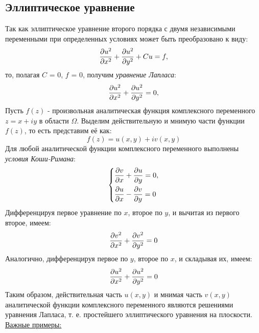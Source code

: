\documentclass[../main.tex]{subfiles}
\begin{document}
\subsection{Эллиптическое уравнение}
Так как эллиптическое уравнение второго порядка с двумя независимыми переменными при определенных условиях может быть преобразовано к виду:
\[
	\pderivtwo{u}{x}{x} + \pderivtwo{u}{y}{y} + Cu = f,
\]
то, полагая $C$ = 0, $f$ = 0, получим \textit{уравнение Лапласа}:
\begin{equation}
	\pderivtwo{u}{x}{x} + \pderivtwo{u}{y}{y} = 0,
\end{equation}
Пусть $f(z)$ - произвольная аналитическая функция комплексного переменного $z = x + iy$ в области $\Omega$. Выделим действительную и мнимую части функции $f(z)$, то есть представим её как:
\[
	f(z) = u(x, y) + iv(x,y)
\]
Для любой аналитической функции комплексного переменного
выполнены \textit{условия Коши-Римана}:
\begin{equation}
	\begin{dcases}
		\frac{\partial v}{\partial x} + \frac{\partial u}{\partial y} = 0, \\
		\frac{\partial u}{\partial x} - \frac{\partial v}{\partial y} = 0
	\end{dcases}
\end{equation}
Дифференцируя первое уравнение по $x$, второе по $y$, и вычитая из первого второе, имеем:
\[
	\pderivtwo{v}{x}{x} + \pderivtwo{v}{y}{y} = 0
\]
Аналогично, дифференцируя первое по $y$, второе по $x$, и складывая их, имеем:
\[
	\pderivtwo{u}{x}{x} + \pderivtwo{u}{y}{y} = 0
\]
Таким образом, действительная часть $u(x, y)$ и мнимая часть $v(x, y)$ аналитической функции комплексного переменного являются решениями уравнения Лапласа, т. е. простейшего эллиптического уравнения на плоскости.\\
\underline{Важные примеры:}
\end{document}
